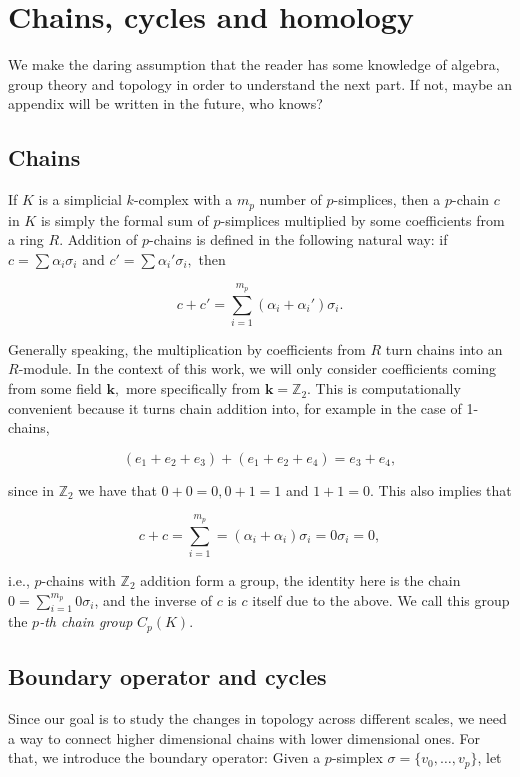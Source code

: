 \section{Chains, cycles and homology}
We make the daring assumption that the reader has some knowledge of algebra, group theory and topology in order to understand the next part. If not, maybe an appendix will be written in the future, who knows?

\subsection{Chains}
If $K$ is a simplicial $k$-complex with a $m_{p}$ number of $p$-simplices, then a $p$-chain $c$ in $K$ is simply the formal sum of $p$-simplices multiplied by some coefficients from a ring $R$. Addition of $p$-chains is defined in the following natural way: if $c = \sum \alpha_{i}\sigma_{i}$ and $c' = \sum \alpha_{i}'\sigma_{i},$ then

\begin{equation*}
  c + c' = \sum_{i=1}^{m_{p}} (\alpha_{i} + \alpha_{i}')\sigma_{i}.
\end{equation*}

Generally speaking, the multiplication by coefficients from $R$ turn chains into an $R$-module. In the context of this work, we will only consider coefficients coming from some field $\boldsymbol{k},$ more specifically from $\boldsymbol{k} = \mathbb{Z}_{2}$. This is computationally convenient because it turns chain addition into, for example in the case of 1-chains,

\begin{equation*}
  (e_{1} + e_{2} + e_{3}) + (e_{1} + e_{2} + e_{4}) = e_{3} + e_{4},
\end{equation*}

since in $\mathbb{Z}_{2}$ we have that $0 + 0 = 0, 0 + 1 = 1$ and $1+1 = 0$. This also implies that

\begin{equation*}
  c + c = \sum_{i=1}^{m_{p}} = (\alpha_{i} + \alpha_{i})\sigma_{i} = 0\sigma_{i} = 0,
\end{equation*}

i.e., $p$-chains with $\mathbb{Z}_{2}$ addition form a group, the identity here is the chain $0 = \sum_{i=1}^{m_{p}}0\sigma_{i}$, and the inverse of $c$ is $c$ itself due to the above. We call this group the \textit{$p$-th chain group} $C_{p}(K)$.

\subsection{Boundary operator and cycles}
Since our goal is to study the changes in topology across different scales, we need a way to connect higher dimensional chains with lower dimensional ones. For that, we introduce the boundary operator: Given a $p$-simplex $\sigma = \{v_{0}, \ldots, v_{p}\}$, let

